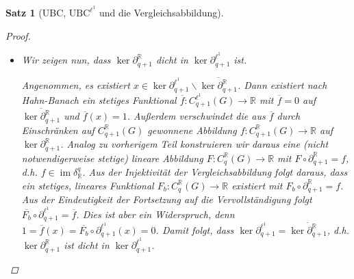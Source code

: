 \documentclass[a4paper,twoside,10pt]{scrreprt}
\DeclareMathOperator{\img}{im}
\newcommand{\R}{\mathbb{R}}
\newtheorem{satz}{Satz}[section]
\theoremstyle{definition}
\begin{document}
\begin{satz}[UBC, $\text{UBC}^{\ell^1}$ und die Vergleichsabbildung]
\begin{proof}
\begin{itemize}
Wir setzen diese zu einer linearen Abbildung $F:C_q^{\R}(G)\to \R$ fort.
Dann gilt $F\circ \partial_{q+1}^{\R}=f$, d.h. $f\in \img \delta_{\R}^q$. Aus der Injektivität der Vergleichsabbildung folgt somit, dass $f\in \img \delta_{\R,b}^q$, also ist $\img \partial_{q+1}^{\ell^1}$ abgeschlossen.\par
Daraus folgt aus dem Prinzip der offenen Abbildung, dass $\overline{\partial_{q+1}^{\ell^1}}:\frac{C_{q+1}^{\ell^1}(G)}{\ker \partial_{q+1}^{\ell^1}}\to \img \partial_{q+1}^{\ell^1}$ ein Isomorphismus (hier im Sinne stetiger, linearer Abbildungen) ist. Es sei $\|\cdot\|_{\text{quot}}$ die Quotientennorm auf $\frac{C_{q+1}^{\ell^1}(G)}{\ker \partial_{q+1}^{\ell^1}}$. Dann existiert damit ein $K>0$, sodass für alle $z\in \img \partial_{q+1}^{\ell^1}$ ein $c\in C_{q+1}^{\ell^1}(G)$ existiert mit $\partial_{q+1}^{\R}(c)=z$, $2\|[c]\|_{\text{quot}}\leq K\|z\|_1$ und $\|c\|_1\leq 2\|[c]\|_{\text{quot}}$, womit $q$-$\text{UBC}^{\ell^1}$ erfüllt ist.\par
\item Wir zeigen nun, dass $\ker \partial_{q+1}^{\R}$ dicht in $\ker \partial_{q+1}^{\ell^1}$ ist.\par
Angenommen, es existiert $x\in \ker \partial_{q+1}^{\ell^1}\backslash\overline{\ker \partial_{q+1}^{\R}}$. Dann existiert nach Hahn-Banach ein stetiges Funktional $\overline{f}:C_{q+1}^{\ell^1}(G)\to \R$ mit $\overline{f}=0$ auf $\overline{\ker \partial_{q+1}^{\R}}$ und $\overline{f}(x)=1$. Außerdem verschwindet die aus $\overline{f}$ durch Einschränken auf $C_{q+1}^{\R}(G)$ gewonnene Abbildung $f:C_{q+1}^{\R}(G)\to \R$ auf $\ker \partial_{q+1}^{\R}$. Analog zu vorherigem Teil konstruieren wir daraus eine (nicht notwendigerweise stetige) lineare Abbildung $F:C_q^{\R}(G)\to \R$ mit $F\circ \partial_{q+1}^{\R}=f$, d.h. $f\in \img \delta_{\R}^q$. Aus der Injektivität der Vergleichsabbildung folgt daraus, dass ein stetiges, lineares Funktional $F_b:C_q^{\R}(G)\to \R$ existiert mit $F_b\circ \partial_{q+1}^{\R}=f$. Aus der Eindeutigkeit der Fortsetzung auf die Vervollständigung folgt $\overline{F_b}\circ \partial_{q+1}^{\ell^1}=\overline{f}$. Dies ist aber ein Widerspruch, denn $1=\overline{f}(x)=\overline{F_b}\circ \partial_{q+1}^{\ell^1}(x)=0$. Damit folgt, dass $\ker \partial_{q+1}^{\ell^1}=\overline{\ker \partial_{q+1}^{\R}}$, d.h. $\ker \partial_{q+1}^{\R}$ ist dicht in $\ker \partial_{q+1}^{\ell^1}$.
\end{itemize}
\end{proof}
\end{satz}
\end{document}
